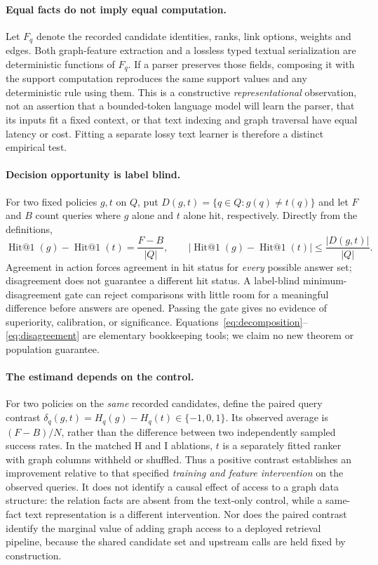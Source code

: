 \documentclass{article}
\begin{document}
\paragraph{Equal facts do not imply equal computation.}
Let $F_q$ denote the recorded candidate identities, ranks, link options,
weights and edges. Both graph-feature extraction and a lossless typed textual
serialization are deterministic functions of $F_q$. If a parser preserves
those fields, composing it with the support computation reproduces the same
support values and any deterministic rule using them. This is a constructive
\emph{representational} observation, not an assertion that a bounded-token
language model will learn the parser, that its inputs fit a fixed context,
or that text indexing and graph traversal have equal latency or cost.
Fitting a separate lossy text learner is therefore a distinct empirical test.

\paragraph{Decision opportunity is label blind.}
For two fixed policies $g,t$ on $Q$, put
$D(g,t)=\{q\in Q:g(q)\ne t(q)\}$ and let $F$ and $B$ count queries
where $g$ alone and $t$ alone hit, respectively. Directly from the
definitions,
\begin{equation}\label{eq:disagreement}
 \operatorname{Hit@1}(g)-\operatorname{Hit@1}(t)
 =\frac{F-B}{|Q|},\qquad
 \left|\operatorname{Hit@1}(g)-\operatorname{Hit@1}(t)\right|
 \leq \frac{|D(g,t)|}{|Q|}.
\end{equation}
Agreement in action forces agreement in hit status for \emph{every} possible
answer set; disagreement does not guarantee a different hit status. A
label-blind minimum-disagreement gate can reject comparisons with little
room for a meaningful difference before answers are opened. Passing the
gate gives no evidence of superiority, calibration, or significance.
Equations~\eqref{eq:decomposition}--\eqref{eq:disagreement} are elementary
bookkeeping tools; we claim no new theorem or population guarantee.

\paragraph{The estimand depends on the control.}
For two policies on the \emph{same} recorded candidates, define the paired
query contrast $\delta_q(g,t)=H_q(g)-H_q(t)\in\{-1,0,1\}$. Its observed
average is $(F-B)/N$, rather than the difference between two independently
sampled success rates. In the matched H and I ablations, $t$ is a
separately fitted ranker with graph columns withheld or shuffled. Thus a
positive contrast establishes an improvement relative to that specified
\emph{training and feature intervention} on the observed queries. It does
not identify a causal effect of access to a graph data structure: the
relation facts are absent from the text-only control, while a same-fact
text representation is a different intervention. Nor does the paired
contrast identify the marginal value of adding graph access to a deployed
retrieval pipeline, because the shared candidate set and upstream calls
are held fixed by construction.
\end{document}
